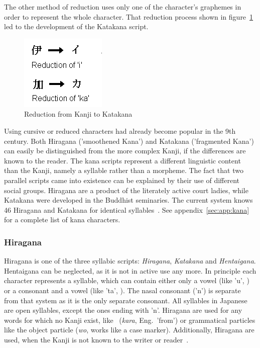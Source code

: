 The other method of reduction uses only one of the character's graphemes in
order to represent the whole character. That reduction process shown in 
figure~\ref{fig:reductiontokatakana} led to the development of the
Katakana script.
\begin{figure}[htbp] 
\begin{center}
\includegraphics[scale=0.7]{images/reductiontokatakana.png}
\caption{Reduction from Kanji to Katakana}
\label{fig:reductiontokatakana}
\end{center}
\end{figure}

Using cursive or reduced characters had already become popular in the 9th 
century.
Both Hiragana ('smoothened Kana') and Katakana ('fragmented Kana') can easily be 
distinguished from the more complex Kanji,
if the differences are known to the reader.
The kana scripts represent a different linguistic 
content than the Kanji, namely a syllable rather than a morpheme.
The fact that two parallel scripts came into existence can be explained by 
their use of different social groups. Hiragana are a product of the literately 
active court ladies, while Katakana were developed in the Buddhist seminaries.
The current system knows 46 Hiragana and Katakana for identical 
syllables~. See appendix~\ref{sec:app:kana} for a 
complete list of kana characters.

\subsubsection{Hiragana }
\label{sec:hiragana}

Hiragana is one of the three syllabic scripts: \emph{Hiragana}, \emph{Katakana} 
and \emph{Hentaigana}. Hentaigana can be neglected, as it is not in active use 
any more. %
In principle each character represents a syllable, which can contain either only 
a vowel (like 'u', ) or a consonant and a vowel (like 'ta', ). 
The nasal consonant  ('n') is separate from that system as it is the
only separate consonant. All syllables in Japanese are open syllables, except the
ones ending with 'n'.
Hiragana are used for any words for which no Kanji exist, like 
~(\emph{kara}, Eng.\ 'from') or grammatical particles like the object 
particle  (\emph{wo}, works like a case marker).
Additionally, Hiragana are used, when the Kanji is not known to the writer or 
reader~. 

